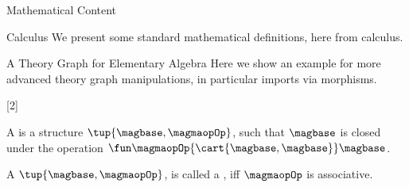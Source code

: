 \documentclass{omdoc}
\begin{document}
 


\begin{omgroup}[id=sec.math]{Mathematical Content}
  \begin{omgroup}{Calculus}
    We present some standard mathematical definitions, here from calculus.
\end{omgroup}

\begin{omgroup}[id=sec.math]{A Theory Graph for Elementary Algebra}
  Here we show an example for more advanced theory graph manipulations, in particular
  imports via morphisms.

\begin{module}[id=magma]
  [2]{\infix{}}
  \begin{definition}[id=magma.def]
    A  is a structure $\tup{\magbase,\magmaopOp}$, such that $\magbase$ is
    closed under the operation $\fun\magmaopOp{\cart{\magbase,\magbase}}\magbase$.
 \end{definition}
\end{module}

\begin{module}[id=semigroup]
  \begin{definition}[id=semigroup.def]
    A  $\tup{\magbase,\magmaopOp}$, is called a , iff
    $\magmaopOp$ is associative.
  \end{definition}
\end{module}

\end{omgroup}
\end{omgroup}
\end{document}
